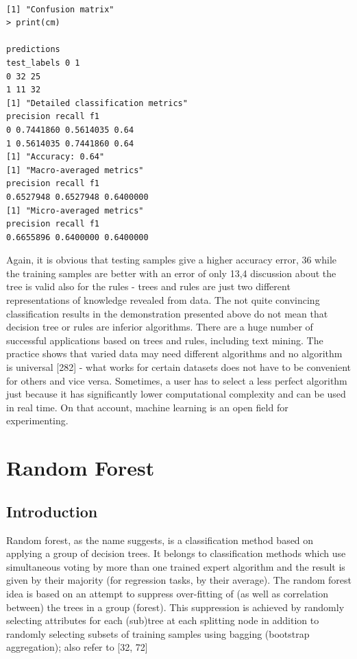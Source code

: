 \documentclass[11pt,openany,executivepaper]{book}
\begin{document}
\begin{verbatim}

[1] "Confusion matrix"
> print(cm)

predictions
test_labels 0 1
0 32 25
1 11 32
[1] "Detailed classification metrics"
precision recall f1
0 0.7441860 0.5614035 0.64
1 0.5614035 0.7441860 0.64
[1] "Accuracy: 0.64"
[1] "Macro-averaged metrics"
precision recall f1
0.6527948 0.6527948 0.6400000
[1] "Micro-averaged metrics"
precision recall f1
0.6655896 0.6400000 0.6400000
\end{verbatim}

Again, it is obvious that testing samples give a higher accuracy error, 36%
while the training samples are better with an error of only 13,4%
discussion about the tree is valid also for the rules - trees and rules are just two
different representations of knowledge revealed from data.
The not quite convincing classification results in the demonstration presented
above do not mean that decision tree or rules are inferior algorithms. There are a
huge number of successful applications based on trees and rules, including text
mining. The practice shows that varied data may need different algorithms and no
algorithm is universal [282] - what works for certain datasets does not have to be
convenient for others and vice versa. Sometimes, a user has to select a less perfect
algorithm just because it has significantly lower computational complexity and
can be used in real time. On that account, machine learning is an open field for
experimenting.

\chapter{Random Forest} %
\section{Introduction}
Random forest, as the name suggests, is a classification method based on applying a group of decision trees. It belongs to classification methods which use
simultaneous voting by more than one trained expert algorithm and the result is
given by their majority (for regression tasks, by their average).
The random forest idea is based on an attempt to suppress over-fitting of
(as well as correlation between) the trees in a group (forest). This suppression
is achieved by randomly selecting attributes for each (sub)tree at each splitting
node in addition to randomly selecting subsets of training samples using bagging
(bootstrap aggregation); also refer to [32, 72]
\end{document}
